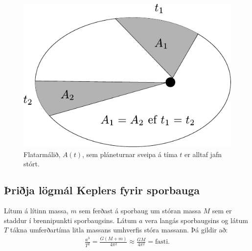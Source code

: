 \ifdefined \wholebook \else\documentclass[oneside]{book}\usepackage{EdlBook}\graphicspath{{figures/}}
\begin{document}
\begin{figure}[H]
    \centering
    \includegraphics[scale = 0.8]{figures/keplersecondlaw.pdf}
    \caption{Flatarmálið, $A(t)$, sem pláneturnar sveipa á tíma $t$ er alltaf jafn stórt.}
    \label{fig:kepler2ndlaw}
\end{figure}



\subsection*{Þriðja lögmál Keplers fyrir sporbauga}

\begin{tcolorbox}
\begin{theorem}
    Lítum á lítinn massa, $m$ sem ferðast á sporbaug um stóran massa $M$ sem er staddur í brennipunkti sporbaugsins. Látum $a$ vera langás sporbaugsins og látum $T$ tákna umferðartíma litla massans umhverfis stóra massann. Þá gildir að:
\begin{align*}
    \frac{a^3}{T^2} = \frac{G(M+m)}{4\pi^2} \approx \frac{GM}{4\pi^2} = \text{fasti}.
\end{align*}
\end{theorem}
\end{tcolorbox}
\end{document}
